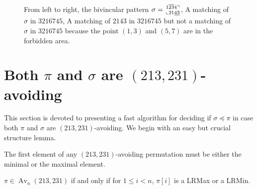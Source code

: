 \documentclass[a4paper]{llncs}
\DeclareMathOperator{\AV}{Av}
\newcommand\BV[2]{\genfrac{}{}{0pt}{}{#1}{#2}}
\begin{document}
\begin{figure}[t]
    	 
    	 
    	    	
    	\caption[Example pattern matching]{
    		From left to right,
    		the bivincular pattern $\sigma = \BV{1\overline{23}4\urcorner}{\llcorner 21\underline{43}  }$, A matching of $\sigma$ in $3216745$, A matching of $2143$ in $3216745$ but not a matching of $\sigma$ in $3216745$ because the point $(1,3)$ and $(5,7)$ are in the forbidden area.} 
    	\label{example:bivincular pattern matching}
\end{figure}


\section{Both $\pi$ and $\sigma$ are $(213,231)$-avoiding}
\label{section:both are (213,231)-avoiding}



This section is devoted to presenting a fast algorithm for deciding if
$\sigma \preceq \pi$
in case both $\pi$ and $\sigma$ are $(213,231)$-avoiding.
We begin with an easy but crucial structure lemma.

\begin{lemma}[Folklore]
\label{lemma:first element is 1 or n}
The first element of any $(213,231)$-avoiding permutation
must be either the minimal or the maximal element.
\end{lemma}



\begin{corollary}
\label{corollary:minmaxelement}
$\pi \in \AV_n(213,231)$ if and only if for $1 \leq i < n$,
$\pi[i]$ is a LRMax or a LRMin.
\end{corollary}
\end{document}

